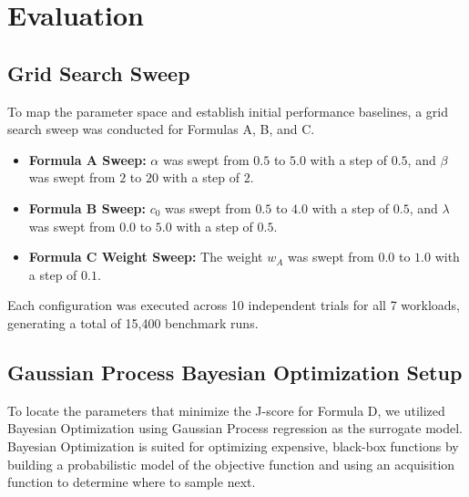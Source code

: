 \section{Evaluation}

\subsection{Grid Search Sweep}
To map the parameter space and establish initial performance baselines, a grid 
search sweep was conducted for Formulas A, B, and C.
\begin{itemize}
    \item \textbf{Formula A Sweep:} $\alpha$ was swept from $0.5$ to $5.0$ with a 
    step of $0.5$, and $\beta$ was swept from $2$ to $20$ with a step of $2$.
    \item \textbf{Formula B Sweep:} $c_0$ was swept from $0.5$ to $4.0$ with a step 
    of $0.5$, and $\lambda$ was swept from $0.0$ to $5.0$ with a step of $0.5$.
    \item \textbf{Formula C Weight Sweep:} The weight $w_A$ was swept from $0.0$ to 
    $1.0$ with a step of $0.1$.
\end{itemize}
Each configuration was executed across 10 independent trials for all 7 workloads, 
generating a total of 15,400 benchmark runs.

\subsection{Gaussian Process Bayesian Optimization Setup}
To locate the parameters that minimize the J-score for Formula D, we utilized 
Bayesian Optimization using Gaussian Process regression as the surrogate model. 
Bayesian Optimization is suited for optimizing expensive, black-box functions 
by building a probabilistic model of the objective function and using an 
acquisition function to determine where to sample next.

